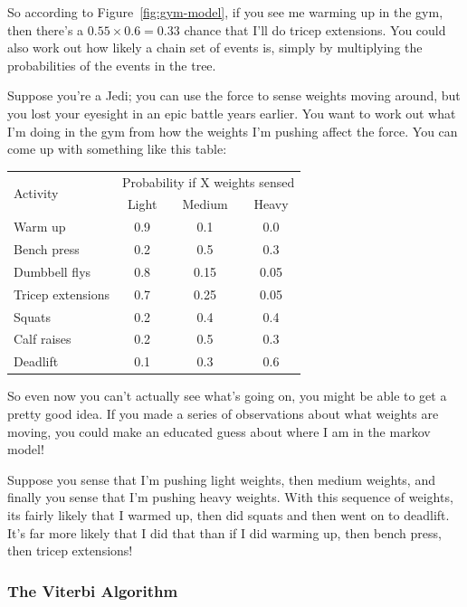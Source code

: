 So according to Figure~\ref{fig:gym-model}, if you see me warming up in the gym,
then there's a $0.55 \times 0.6 = 0.33$ chance that I'll do tricep extensions.
You could also work out how likely a chain set of events is, simply by
multiplying the probabilities of the events in the tree.


Suppose you're a Jedi; you can use the force to sense weights moving around, but
you lost your eyesight in an epic battle years earlier. You want to work out
what I'm doing in the gym from how the weights I'm pushing affect the force. You
can come up with something like this table:

\begin{center}
  \begin{tabular}{l|c|c|c}
    \multirow{2}{*}{Activity} &
    \multicolumn{3}{c}{Probability if X weights sensed}\\ \cline{2-4}
                              & Light & Medium & Heavy\\ \hline
    Warm up & 0.9 & 0.1 & 0.0\\ \hline
    Bench press & 0.2 & 0.5 & 0.3\\ \hline
    Dumbbell flys & 0.8 & 0.15 & 0.05\\ \hline
    Tricep extensions & 0.7 & 0.25 & 0.05\\ \hline
    Squats & 0.2 & 0.4 & 0.4\\ \hline
    Calf raises & 0.2 & 0.5 & 0.3\\ \hline
    Deadlift & 0.1 & 0.3 & 0.6\\ \hline
  \end{tabular}
\end{center}

So even now you can't actually see what's going on, you might be able to get a
pretty good idea. If you made a series of observations about what weights are
moving, you could make an educated guess about where I am in the markov model!

Suppose you sense that I'm pushing light weights, then medium weights, and
finally you sense that I'm pushing heavy weights. With this sequence of weights,
its fairly likely that I warmed up, then did squats and then went on to
deadlift. It's far more likely that I did that than if I did warming up, then
bench press, then tricep extensions!

\subsubsection{The Viterbi Algorithm}

